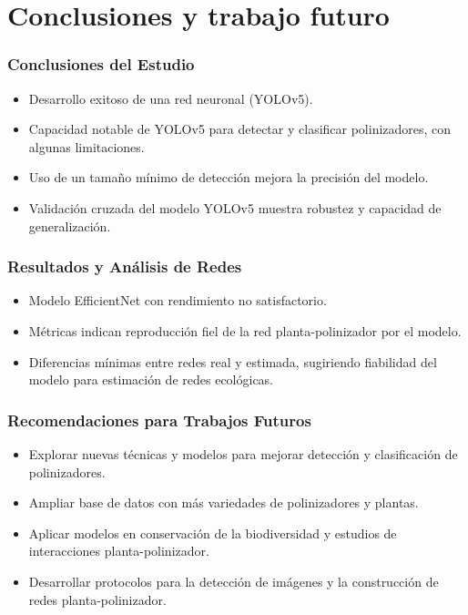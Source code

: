 \section{Conclusiones y trabajo futuro}


\begin{frame}
\frametitle{Conclusiones del Estudio}
\vspace*{-10mm}
\begin{itemize}
    \item Desarrollo exitoso de una red neuronal (YOLOv5).
    \item Capacidad notable de YOLOv5 para detectar y clasificar polinizadores, con algunas limitaciones.
    \item Uso de un tamaño mínimo de detección mejora la precisión del modelo.
    \item Validación cruzada del modelo YOLOv5 muestra robustez y capacidad de generalización.
\end{itemize}
\end{frame}

\begin{frame}
    \frametitle{Resultados y Análisis de Redes}
    \vspace*{-10mm}
    \begin{itemize}
        \item Modelo EfficientNet con rendimiento no satisfactorio.
        \item Métricas indican reproducción fiel de la red planta-polinizador por el modelo.
        \item Diferencias mínimas entre redes real y estimada, sugiriendo fiabilidad del modelo para estimación de redes ecológicas.
    \end{itemize}
\end{frame}    

\begin{frame}
    \frametitle{Recomendaciones para Trabajos Futuros}
    \vspace*{-5mm}
    \begin{itemize}
        \item Explorar nuevas técnicas y modelos para mejorar detección y clasificación de polinizadores.
        \item Ampliar base de datos con más variedades de polinizadores y plantas.
        \item Aplicar modelos en conservación de la biodiversidad y estudios de interacciones planta-polinizador.
        \item Desarrollar protocolos para la detección de imágenes y la construcción de redes planta-polinizador.
    \end{itemize}
    \end{frame}
    

